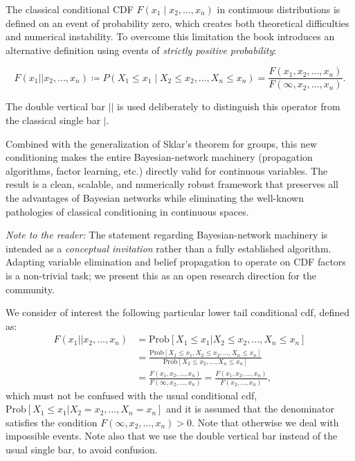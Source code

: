 \begin{tcolorbox}[colback=orange!5!white,colframe=orange!75!black,title=Practical Conceptual Innovation: Conditioning with Positive Probability]
The classical conditional CDF \(F(x_1 \mid x_2,\dots,x_n)\) in continuous distributions is defined on an event of probability zero, which creates both theoretical difficulties and numerical instability. To overcome this limitation the book introduces an alternative definition using events of \emph{strictly positive probability}:

\[
F(x_1 || x_2,\dots,x_n) \coloneqq P(X_1\leq x_1 \mid X_2\leq x_2,\dots,X_n\leq x_n) = \frac{F(x_1,x_2,\dots,x_n)}{F(\infty,x_2,\dots,x_n)}.
\]

The double vertical bar \(||\) is used deliberately to distinguish this operator from the classical single bar \(|\).

Combined with the generalization of Sklar’s theorem for groups, this new conditioning makes the entire Bayesian-network machinery (propagation algorithms, factor learning, etc.) directly valid for continuous variables. The result is a clean, scalable, and numerically robust framework that preserves all the advantages of Bayesian networks while eliminating the well-known pathologies of classical conditioning in continuous spaces.

\vspace{0.2cm}
\textit{Note to the reader:} The statement regarding Bayesian-network machinery is intended as a \emph{conceptual invitation} rather than a fully established algorithm. Adapting variable elimination and belief propagation to operate on CDF factors is a non-trivial task; we present this as an open research direction for the community.
\end{tcolorbox}

We consider of interest the following particular lower tail conditional cdf, defined as:
\begin{align}
F(x_1 || x_2,\ldots, x_n) &= \text{Prob}[X_1 \leq x_1|X_2 \leq x_2,\ldots,X_n \leq x_n] \nonumber\\
&= \frac{\text{Prob}[X_1 \leq x_1, X_2 \leq x_2,\ldots, X_n \leq x_n]}{\text{Prob}[X_2 \leq x_2,\ldots, X_n \leq x_n]} \nonumber\\
&= \frac{F(x_1, x_2,\ldots, x_n)}{F(\infty, x_2,\ldots, x_n)} = \frac{F(x_1, x_2,\ldots, x_n)}{F(x_2,\ldots, x_n)},
\label{eq:lowertailconditional}
\end{align}
which must not be confused with the usual conditional cdf, $\text{Prob}[X_1 \leq x_1|X_2 = x_2,\ldots,X_n = x_n]$ and it is assumed that the denominator satisfies the condition $F(\infty, x_2,\ldots, x_n) > 0$. Note that otherwise we deal with impossible events. Note also that we use the double vertical bar instead of the usual single bar, to avoid confusion.

